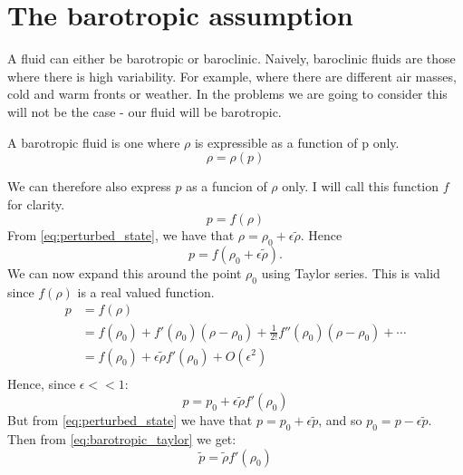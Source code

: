 \section{The barotropic assumption} \label{ss:barotropic_assumption}
A fluid can either be barotropic or baroclinic.
%
Naively, baroclinic fluids are those where there is high variability. For example, where there are different air masses, cold and warm fronts or weather. In the problems we are going to consider this will not be the case - our fluid will be barotropic.
    \begin{defn} \parencite{shames02mechanics} A barotropic fluid is one where $\rho$ is expressible as a function of p only.
        \[ \rho = \rho(p)
        \]
    \end{defn}
%
We can therefore also express $p$ as a funcion of $\rho$ only. I will call this function $f$ for clarity.
    \begin{equation}\label{eq:defn_f}
         p = f(\rho)
    \end{equation}
%
From \eqref{eq:perturbed_state}, we have that $\rho = \rho_0 + \epsilon \tilde{\rho}$. Hence
    \begin{equation*}
        p = f(\rho_0 + \epsilon\tilde{\rho}).
    \end{equation*}
%
We can now expand this around the point $\rho_0$ using Taylor series. This is valid since $f(\rho)$ is a real valued function.
    \begin{align*}
        p &= f(\rho) \\
        & = f(\rho_0) + f'(\rho_0)(\rho - \rho_0) + \frac{1}{2!}f''(\rho_0)(\rho - \rho_0) + \dotsb \\
        &= f(\rho_0) + \epsilon \tilde{\rho}f'(\rho_0) + O(\epsilon^2)\\
    \end{align*}
%
Hence, since $\epsilon << 1$:
    \begin{equation}\label{eq:barotropic_taylor}
        p = p_0 + \epsilon \tilde{\rho}f'(\rho_0)
    \end{equation}
%
But from \eqref{eq:perturbed_state} we have that $p = p_0 + \epsilon \tilde{p}$, and so $p_0 = p - \epsilon\tilde{p}$. Then from \eqref{eq:barotropic_taylor} we get:
    \begin{equation}\label{eq:barotropic_condition}
        \tilde{p} = \tilde{\rho} f'(\rho_0)
    \end{equation}
